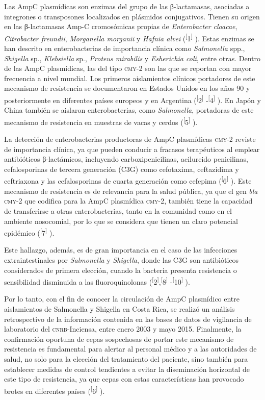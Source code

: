 \documentclass{article}
\begin{document}
Las AmpC plasmídicas son enzimas del grupo de las β-lactamasas, asociadas a
integrones o transposones localizados en plásmidos conjugativos. Tienen su
origen en las β-lactamasas Amp-C cromosómicas propias de \textit{Enterobacter
cloacae}, \textit{Citrobacter freundii}, \textit{Morganella morganii}
y \textit{Hafnia alvei}
(\textsuperscript{[}1\textsuperscript{]}
). Estas enzimas se han descrito en enterobacterias de importancia clínica como
\textit{Salmonella}
spp., \textit{Shigella}
sp., \textit{Klebsiella}
sp., \textit{Proteus mirabilis}
y \textit{Esherichia coli}, entre otras. Dentro de las AmpC plasmídicas, las del tipo \textsc{cmy}-2 son las que se
reportan con mayor frecuencia a nivel mundial. Los primeros aislamientos
clínicos portadores de este mecanismo de resistencia se documentaron en Estados
Unidos en los años 90 y posteriormente en diferentes países europeos y en
Argentina (\textsuperscript{[}2\textsuperscript{]}
-\textsuperscript{[}4\textsuperscript{]}
). En Japón y China también se aislaron enterobacterias, como
\textit{Salmonella}, portadoras de este mecanismo de resistencia en muestras de vacas y cerdos
(\textsuperscript{[}5\textsuperscript{]}
).

La detección de enterobacterias productoras de AmpC plasmídicas \textsc{cmy}-2 reviste de
importancia clínica, ya que pueden conducir a fracasos terapéuticos al emplear
antibióticos β-lactámicos, incluyendo carboxipenicilinas, acilureido
penicilinas, cefalosporinas de tercera generación (C3G) como cefotaxima,
ceftazidima y ceftriaxona y las cefalosporinas de cuarta generación como
cefepima (\textsuperscript{[}6\textsuperscript{]}
). Este mecanismo de resistencia es de relevancia para la salud pública, ya que
el gen \textit{bla}
\textsc{cmy}-2 que codifica para la AmpC plasmídica \textsc{cmy}-2, también tiene la capacidad de
transferirse a otras enterobacterias, tanto en la comunidad como en el ambiente
nosocomial, por lo que se considera que tienen un claro potencial epidémico
(\textsuperscript{[}7\textsuperscript{]}
).

Este hallazgo, además, es de gran importancia en el caso de las infecciones
extraintestinales por \textit{Salmonella}
y \textit{Shigella}, donde las C3G son antibióticos considerados de primera elección, cuando la
bacteria presenta resistencia o sensibilidad disminuida a las fluoroquinolonas
(\textsuperscript{[}2\textsuperscript{]},\textsuperscript{[}8\textsuperscript{]}
-\textsuperscript{[}10\textsuperscript{]}
).

Por lo tanto, con el fin de conocer la circulación de AmpC plasmídico entre
aislamientos de Salmonella y Shigella en Costa Rica, se realizó un análisis
retrospectivo de la información contenida en las bases de datos de vigilancia de
laboratorio del \textsc{cnrb}-Inciensa, entre enero 2003 y mayo 2015. Finalmente, la
confirmación oportuna de cepas sospechosas de portar este mecanismo de
resistencia es fundamental para alertar al personal médico y a las autoridades
de salud, no solo para la elección del tratamiento del paciente, sino también
para establecer medidas de control tendientes a evitar la diseminación
horizontal de este tipo de resistencia, ya que cepas con estas características
han provocado brotes en diferentes países
(\textsuperscript{[}6\textsuperscript{]}
).
\end{document}
